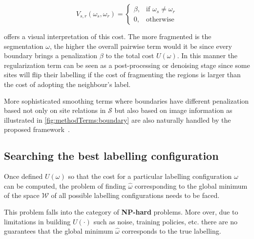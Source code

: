 \begin{equation}
V_{s,r}(\omega_s,\omega_r) = 
\begin{cases}
    \beta, & \text{if } \omega_s \ne \omega_r\\
    0,              & \text{otherwise}
\end{cases}
\label{eq:smoothing}
\end{equation}

 offers a visual interpretation of this cost.
The more fragmented is the segmentation $\omega$, the higher the overall pairwise term would it be since every boundary brings a penalization $\beta$ to the total cost $U(\omega)$.
In this manner the regularization term can be seen as a post-processing or denoising stage since some sites will flip their labelling if the cost of fragmenting the regions is larger than the cost of adopting the neighbour's label. 

More sophisticated smoothing terms where boundaries have different penalization based not only on site relations in $\mathcal{S}$ but also based on image information as illustrated in \cref{fig:methodTerms:boundary} are also naturally handled by the proposed framework~\cite{massich2013phd}.


\subsection{Searching the best labelling configuration} \label{sec:method:min}
Once defined $U(\omega)$ so that the cost for a particular labelling configuration $\omega$ can be computed, the problem of finding $\hat{\omega}$ corresponding to the global minimum of the space $\mathcal{W}$ of all possible labelling configurations needs to be faced. 

This problem falls into the category of \textbf{NP-hard} problems. 
More over, due to limitations in building $U(\cdot)$ such as noise, training policies, etc. there are no guarantees that the global minimum $\hat{\omega}$ corresponds to the true labelling.

